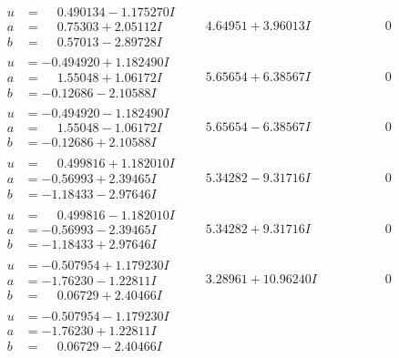 \documentclass[1p]{elsarticle_modified}
\theoremstyle{definition}
\begin{document}
$$\begin{array}{c|c|c}
\begin{aligned}
u &= \phantom{-}0.490134 - 1.175270 I \\
a &= \phantom{-}0.75303 + 2.05112 I \\
b &= \phantom{-}0.57013 - 2.89728 I\end{aligned}
 & \phantom{-}4.64951 + 3.96013 I & \phantom{-0.000000 } 0 \\ \hline\begin{aligned}
u &= -0.494920 + 1.182490 I \\
a &= \phantom{-}1.55048 + 1.06172 I \\
b &= -0.12686 - 2.10588 I\end{aligned}
 & \phantom{-}5.65654 + 6.38567 I & \phantom{-0.000000 } 0 \\ \hline\begin{aligned}
u &= -0.494920 - 1.182490 I \\
a &= \phantom{-}1.55048 - 1.06172 I \\
b &= -0.12686 + 2.10588 I\end{aligned}
 & \phantom{-}5.65654 - 6.38567 I & \phantom{-0.000000 } 0 \\ \hline\begin{aligned}
u &= \phantom{-}0.499816 + 1.182010 I \\
a &= -0.56993 + 2.39465 I \\
b &= -1.18433 - 2.97646 I\end{aligned}
 & \phantom{-}5.34282 - 9.31716 I & \phantom{-0.000000 } 0 \\ \hline\begin{aligned}
u &= \phantom{-}0.499816 - 1.182010 I \\
a &= -0.56993 - 2.39465 I \\
b &= -1.18433 + 2.97646 I\end{aligned}
 & \phantom{-}5.34282 + 9.31716 I & \phantom{-0.000000 } 0 \\ \hline\begin{aligned}
u &= -0.507954 + 1.179230 I \\
a &= -1.76230 - 1.22811 I \\
b &= \phantom{-}0.06729 + 2.40466 I\end{aligned}
 & \phantom{-}3.28961 + 10.96240 I & \phantom{-0.000000 } 0 \\ \hline\begin{aligned}
u &= -0.507954 - 1.179230 I \\
a &= -1.76230 + 1.22811 I \\
b &= \phantom{-}0.06729 - 2.40466 I\end{aligned}

\end{array}$$
\end{document}
